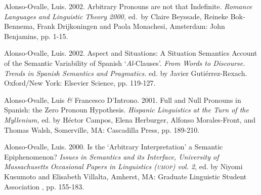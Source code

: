 \documentclass[11pt]{article}
\begin{document}
Alonso-Ovalle, Luis. 2002. Arbitrary Pronouns are not that Indefinite.  {\it Romance Languages and Linguistic Theory 2000,} ed.\ by Claire Beyssade, Reineke Bok-Bennema, Frank Drijkoningen and Paola Monachesi, Amsterdam: John Benjamins, pp. 1-15. 

Alonso-Ovalle, Luis. 2002. Aspect and Situations: A Situation Semantics Account of the Semantic Variability of Spanish `\emph{Al}-Clauses'. \textit{From Words to Discourse. Trends in Spanish Semantics and Pragmatics.} ed. by Javier Guti\'errez-Rexach. Oxford/New York: Elsevier Science, pp. 119-127. 

Alonso-Ovalle, Luis \textit{\&} Francesco D'Introno. 2001. Full and Null Pronouns in Spanish: the Zero Pronoun Hypothesis. \textit{Hispanic Linguistics at the Turn of the Myllenium,} ed. by H\'ector Campos, Elena Herburger, Alfonso Morales-Front, and Thomas Walsh, Somerville, MA: Cascadilla Press, pp. 189-210.

Alonso-Ovalle, Luis. 2000. Is the `Arbitrary Interpretation' a Semantic Epiphenomenon? {\it Issues in Semantics and its Interface, University of Massachusetts Occasional Papers in Linguistics (\textsc{umop}) vol. 2}, ed. by  Niyomi Kusumoto and Elisabeth Villalta, Amherst, MA: Graduate Linguistic Student Association , pp. 155-183. 


\end{document}
